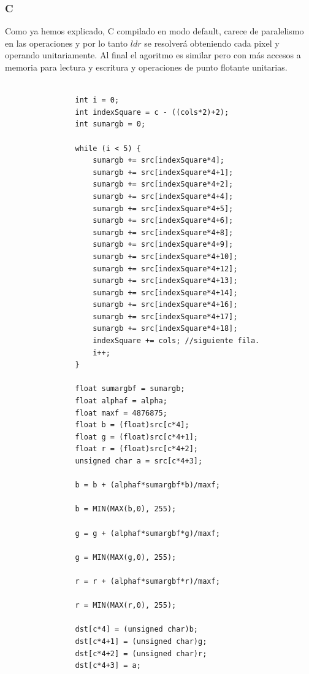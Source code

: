 \subsubsection{C}

Como ya hemos explicado, C compilado en modo default, carece de paralelismo en las operaciones y por lo tanto $ldr$ se resolverá obteniendo cada pixel y operando unitariamente. Al final el agoritmo es similar pero con más accesos a memoria para lectura y escritura y operaciones de punto flotante unitarias.

\begin{codesnippet}
\begin{verbatim}
                
                int i = 0;
                int indexSquare = c - ((cols*2)+2);
                int sumargb = 0;
                
                while (i < 5) {
                    sumargb += src[indexSquare*4];
                    sumargb += src[indexSquare*4+1];
                    sumargb += src[indexSquare*4+2];
                    sumargb += src[indexSquare*4+4];
                    sumargb += src[indexSquare*4+5];
                    sumargb += src[indexSquare*4+6];
                    sumargb += src[indexSquare*4+8];
                    sumargb += src[indexSquare*4+9];
                    sumargb += src[indexSquare*4+10];
                    sumargb += src[indexSquare*4+12];
                    sumargb += src[indexSquare*4+13];
                    sumargb += src[indexSquare*4+14];
                    sumargb += src[indexSquare*4+16];
                    sumargb += src[indexSquare*4+17];
                    sumargb += src[indexSquare*4+18];
                    indexSquare += cols; //siguiente fila.
                    i++;
                }

                float sumargbf = sumargb;
                float alphaf = alpha;
                float maxf = 4876875;
                float b = (float)src[c*4];
                float g = (float)src[c*4+1];
                float r = (float)src[c*4+2];
                unsigned char a = src[c*4+3];

                b = b + (alphaf*sumargbf*b)/maxf;

                b = MIN(MAX(b,0), 255);

                g = g + (alphaf*sumargbf*g)/maxf;

                g = MIN(MAX(g,0), 255);

                r = r + (alphaf*sumargbf*r)/maxf;

                r = MIN(MAX(r,0), 255);

                dst[c*4] = (unsigned char)b;
                dst[c*4+1] = (unsigned char)g;
                dst[c*4+2] = (unsigned char)r;
                dst[c*4+3] = a;
                
\end{verbatim}
\end{codesnippet}

